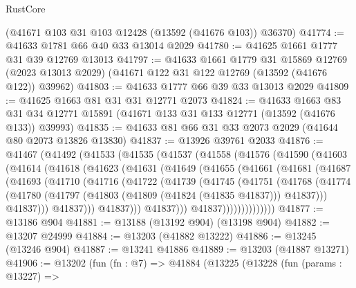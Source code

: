 \begin{lexlean}{RustCore}
\begin{coremodule}
    (@41671 @103 @31 @103 @12428 (@13592 (@41676 @103)) @36370)
@41774 := @41633 @1781 @66 @40 @33 @13014 @2029
@41780 := @41625 @1661 @1777 @31 @39 @12769 @13013
@41797 := @41633
    @1661
    @1779
    @31
    @15869
    @12769
    (@2023 @13013 @2029)
    (@41671 @122 @31 @122 @12769 (@13592 (@41676 @122)) @39962)
@41803 := @41633 @1777 @66 @39 @33 @13013 @2029
@41809 := @41625 @1663 @81 @31 @31 @12771 @2073
@41824 := @41633
    @1663
    @83
    @31
    @34
    @12771
    @15891
    (@41671 @133 @31 @133 @12771 (@13592 (@41676 @133)) @39993)
@41835 := @41633 @81 @66 @31 @33 @2073 @2029 (@41644 @80 @2073 @13826 @13830)
@41837 := @13926 @39761 @2033
@41876 := @41467
    (@41492
      (@41533
        (@41535
          (@41537
            (@41558
              (@41576
                (@41590
                  (@41603
                    (@41614
                      (@41618
                        (@41623
                          (@41631
                            (@41649
                              (@41655
                                (@41661
                                  (@41681
                                    (@41687
                                      (@41693
                                        (@41710
                                          (@41716
                                            (@41722
                                              (@41739
                                                (@41745
                                                  (@41751
                                                    (@41768
                                                      (@41774
                                                        (@41780
                                                          (@41797
                                                            (@41803
                                                              (@41809 (@41824 (@41835 @41837)))
                                                              @41837)))
                                                        @41837)))
                                                  @41837)))
                                            @41837)))
                                      @41837)))
                                @41837))))))))))))))
@41877 := @13186 @904
@41881 := @13188 (@13192 @904) (@13198 @904)
@41882 := @13207 @24999
@41884 := @13203 (@41882 @13222)
@41886 := @13245 (@13246 @904)
@41887 := @13241 @41886
@41889 := @13203 (@41887 @13271)
@41906 := @13202
    (fun (fn : @7) =>
    @41884
      (@13225
        (@13228
          (fun (params : @13227) =>

\end{coremodule}
\end{lexlean}

